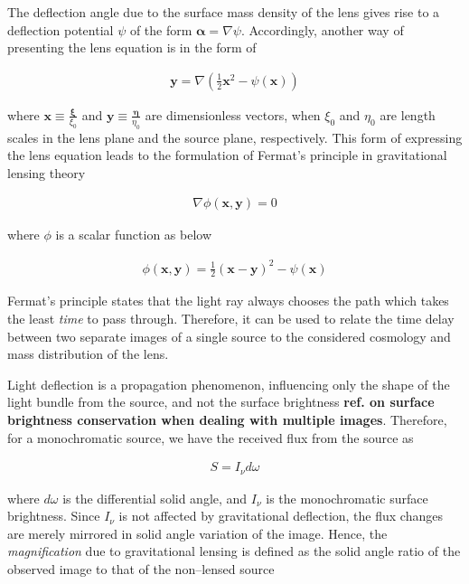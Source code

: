 \documentclass[paper=a4, fontsize=11pt]{scrartcl} %
\numberwithin{equation}{section} %
\numberwithin{figure}{section} %
\numberwithin{table}{section} %
\begin{document}
The deflection angle due to the surface mass density of the lens gives rise to a deflection potential $\psi$ of the form $\boldsymbol \alpha = \nabla \psi$. Accordingly, another way of presenting the lens equation is in the form of 

\begin{eqnarray}
\label{eq:potential_dimensionless_lensing}
\textbf{y} = \nabla \left(\frac{1}{2}\textbf{x}^2 - \psi(\textbf{x}) \right)
\end{eqnarray}

where $\textbf{x} \equiv \frac{\boldsymbol \xi}{\xi_0}$ and $\textbf{y} \equiv \frac{\boldsymbol \eta}{\eta_0}$ are dimensionless vectors, when $\xi_0$ and $\eta_0$ are length scales in the lens plane and the source plane, respectively. This form of expressing the lens equation leads to the formulation of Fermat's principle in gravitational lensing theory

\begin{eqnarray}
\nabla \phi(\textbf{x}, \textbf{y}) = 0
\end{eqnarray}

where $\phi$ is a scalar function as below

\begin{eqnarray}
\phi(\textbf{x}, \textbf{y}) = \frac{1}{2} (\textbf{x} - \textbf{y})^2 - \psi(\textbf{x})
\end{eqnarray}

Fermat's principle states that the light ray always chooses the path which takes the least \emph{time} to pass through. Therefore, it can be used to relate the time delay between two separate images of a single source to the considered cosmology and mass distribution of the lens.


Light deflection is a propagation phenomenon, influencing only the shape of the light bundle from the source, and not the surface brightness {\bf ref. on surface brightness conservation when dealing with multiple images}. Therefore, for a monochromatic source, we have the received flux from the source as 

\begin{eqnarray}
S = I_{\nu} d\omega
\end{eqnarray}

where $d\omega$ is the differential solid angle, and $I_{\nu}$ is the monochromatic surface brightness. Since $I_{\nu}$ is not affected by gravitational deflection, the flux changes are merely mirrored in solid angle variation of the image. Hence, the \emph{magnification} due to gravitational lensing is defined as the solid angle ratio of the observed image to that of the non--lensed source
\end{document}
